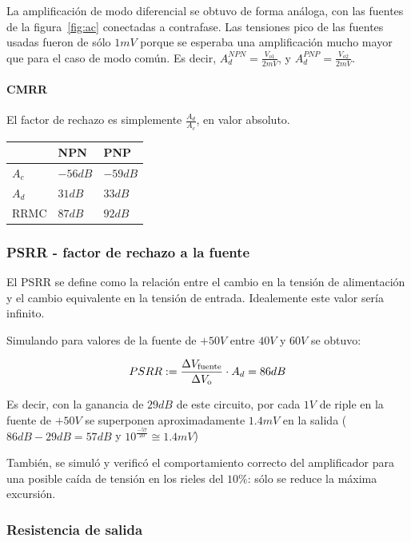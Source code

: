 \documentclass[a4paper,12pt,twoside]{article}
\begin{document}
La amplificación de modo diferencial se obtuvo de forma análoga, con las fuentes de la figura~\ref{fig:ac} conectadas a contrafase. Las tensiones pico de las fuentes usadas fueron de sólo $1mV$ porque se esperaba una amplificación mucho mayor que para el caso de modo común. Es decir, $A_d^{NPN}=\frac{V_{o1}}{2mV}$, y $A_d^{PNP}=\frac{V_{o2}}{2mV}$.

\paragraph{CMRR} El factor de rechazo es simplemente $\frac{A_d}{A_c}$, en valor absoluto.


\begin{table}[H]
\centering
\begin{tabular}{l|ll}
 & NPN & PNP \\ \hline
$A_c$ & $-56dB$ & $-59dB$  \\
$A_d$ & $31dB$ & $33dB$  \\
RRMC & $87dB$ & $92dB$  
\end{tabular}
\end{table}

\subsubsection{PSRR - factor de rechazo a la fuente}

El PSRR se define como la relación entre el cambio en la tensión de alimentación y el cambio equivalente en la tensión de entrada. Idealemente este valor sería infinito.

Simulando para valores de la fuente de $+50V$ entre $40V$ y $60V$ se obtuvo:

\[ PSRR := {\Delta V_\mathrm{fuente} \over {\Delta V_\mathrm{o}}} \cdot A_d = 86dB \]



Es decir, con la ganancia de $29dB$ de este circuito, por cada $1V$ de riple en la fuente de $+50V$ se superponen aproximadamente $1.4mV$ en la salida ($86dB-29dB=57dB$ y $10^\frac{-57}{20} \cong 1.4mV $)

También, se simuló y verificó el comportamiento correcto del amplificador para una posible caída de tensión en los rieles del $10\%$: sólo se reduce la máxima excursión.

\subsubsection{Resistencia de salida}  
\end{document}

